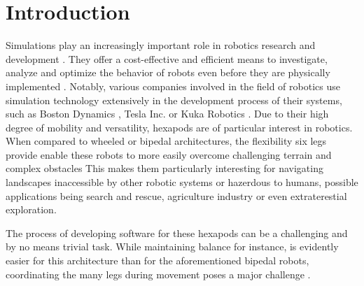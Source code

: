 \chapter{Introduction}
\label{ch:introduction}


Simulations play an increasingly important role in robotics research and development \parencite{afzal2020study}. 
They offer a cost-effective and efficient means to investigate, analyze and optimize the behavior of robots even before they are physically implemented \parencite{de2019analysis}. 
Notably, various companies involved in the field of robotics use simulation technology extensively in the development process of their systems, such as Boston Dynamics \parencite{BostonDynamicsSimulation}, Tesla Inc. \parencite{TeslaAiDay2022} or Kuka Robotics \parencite{KukaSim}.
Due to their high degree of mobility and versatility, hexapods are of particular interest in robotics. 
When compared to wheeled or bipedal architectures, the flexibility six legs provide enable these robots to more easily overcome challenging terrain and complex obstacles \parencite{barai2013smart, atifystructure}
This makes them particularly interesting for navigating landscapes inaccessible by other robotic systems or hazerdous to humans, possible applications being search and rescue, agriculture industry or even extraterestial exploration.

The process of developing software for these hexapods can be a challenging and by no means trivial task. %
While maintaining balance for instance, is evidently easier for this architecture than for the aforementioned bipedal robots, coordinating the many legs during movement poses a major challenge \parencite{azayev2020blind,schilling2013walknet}.

